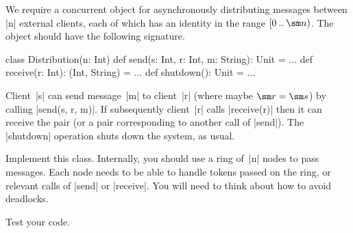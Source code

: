 \begin{questionS}
We require a concurrent object for asynchronously distributing messages
between |n| external clients, each of which has an identity in the range
$\interval{0}{\sm n}$.  The object should have the following signature.
\begin{scala}
class Distribution(n: Int){
  def send(s: Int, r: Int, m: String): Unit = ...
  def receive(r: Int): (Int, String) = ...
  def shutdown(): Unit = ...
}
\end{scala}
%
Client~|s| can send message~|m| to client~|r| (where maybe $\sm r = \sm s$) by
calling |send(s, r, m)|.  If subsequently client~|r| calls |receive(r)| then
it can receive the pair  (or a pair corresponding to another
call of |send|).  The |shutdown| operation shuts down the system, as usual. 

Implement this class.  Internally, you should use a ring of~|n| nodes to pass
messages.  Each node needs to be able to handle tokens passed on the ring, or
relevant calls of |send| or |receive|.  You will need to think about how to
avoid deadlocks.

Test your code.
\end{questionS}


